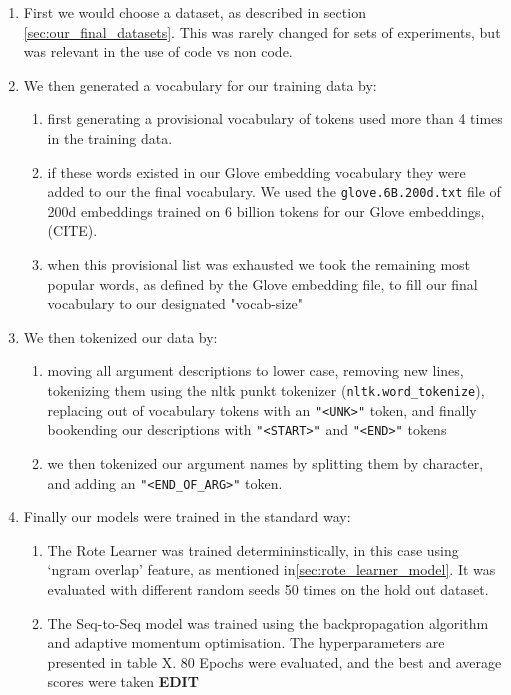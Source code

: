 \begin{enumerate}
    \item First we would choose a dataset, as described in section \ref{sec:our_final_datasets}. 
    This was rarely changed for sets of experiments, but was relevant in the use of code vs non code.


    \item We then generated a vocabulary for our training data by:
    \begin{enumerate}
        \item first generating a provisional vocabulary of tokens used more than 4 times in the training data.
        \item if these words existed in our Glove embedding vocabulary they were added to our the final vocabulary. We used the  \texttt{glove.6B.200d.txt} file of 200d embeddings trained on 6 billion tokens for our Glove embeddings, (CITE). 
        \item when this provisional list was exhausted we took the remaining most popular words, as defined by the Glove embedding file, to fill our final vocabulary to our designated "vocab-size"
    \end{enumerate}

    \item We then tokenized our data by: 
     \begin{enumerate}
         \item moving all argument descriptions to lower case, removing new lines, tokenizing them using the nltk punkt tokenizer (\texttt{nltk.word_tokenize}), replacing out of vocabulary tokens with an \texttt{"<UNK>"} token, and finally bookending our descriptions with \texttt{"<START>"} and \texttt{"<END>"} tokens
         \item we then tokenized our argument names by splitting them by character, and adding an \texttt{"<END_OF_ARG>"} token.
     \end{enumerate}

    \item Finally our models were trained in the standard way:
    \begin{enumerate}
        \item The Rote Learner was trained determininstically, in this case using `ngram overlap' feature, as mentioned in\ref{sec:rote_learner_model}. It was evaluated with different random seeds 50 times on the hold out dataset.
        \item The Seq-to-Seq model was trained using the backpropagation algorithm and adaptive momentum optimisation. The hyperparameters are presented in table X. 80 Epochs were evaluated, and the best and average scores were taken \textbf{EDIT}
    \end{enumerate}


\end{enumerate}
